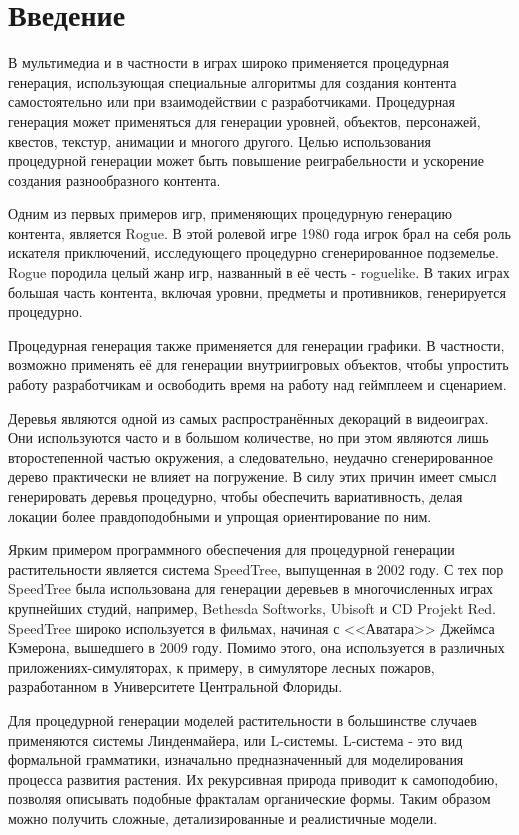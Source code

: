 \chapter{Введение}

В мультимедиа и в частности в играх широко применяется процедурная генерация, использующая специальные алгоритмы для создания контента самостоятельно или при взаимодействии с разработчиками. Процедурная генерация может применяться для генерации уровней, объектов, персонажей, квестов, текстур, анимации и многого другого. Целью использования процедурной генерации может быть повышение реиграбельности и ускорение создания разнообразного контента.

Одним из первых примеров игр, применяющих процедурную генерацию контента, является Rogue. В этой ролевой игре 1980 года игрок брал на себя роль искателя приключений, исследующего процедурно сгенерированное подземелье. \cite{Rogue} Rogue породила целый жанр игр, названный в её честь - roguelike. В таких играх большая часть контента, включая уровни, предметы и противников, генерируется процедурно.

Процедурная генерация также применяется для генерации графики. В частности, возможно применять её для генерации внутриигровых объектов, чтобы упростить работу разработчикам и освободить время на работу над геймплеем и сценарием. 

Деревья являются одной из самых распространённых декораций в видеоиграх. Они используются часто и в большом количестве, но при этом являются лишь второстепенной частью окружения, а следовательно, неудачно сгенерированное дерево практически не влияет на погружение. В силу этих причин имеет смысл генерировать деревья процедурно, чтобы обеспечить вариативность, делая локации более правдоподобными и упрощая ориентирование по ним. 

Ярким примером программного обеспечения для процедурной генерации растительности является система SpeedTree, выпущенная в 2002 году. С тех пор SpeedTree была использована для генерации деревьев в многочисленных играх крупнейших студий, например, Bethesda Softworks, Ubisoft и CD Projekt Red. SpeedTree широко используется в фильмах, начиная с <<Аватара>> Джеймса Кэмерона, вышедшего в 2009 году. Помимо этого, она используется в различных приложениях-симуляторах, к примеру, в симуляторе лесных пожаров, разработанном в Университете Центральной Флориды.

Для процедурной генерации моделей растительности в большинстве случаев применяются системы Линденмайера, или L-системы. L-система - это вид формальной грамматики, изначально предназначенный для моделирования процесса развития растения. Их рекурсивная природа приводит к самоподобию, позволяя описывать подобные фракталам органические формы. Таким образом можно получить сложные, детализированные и реалистичные модели.

